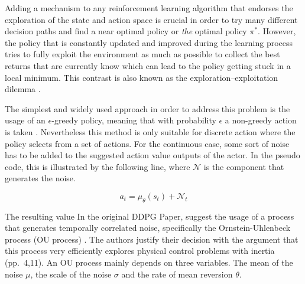 Adding a mechanism to any reinforcement learning algorithm that endorses the exploration of the state and action space is crucial in order to try many different decision paths and find a near optimal policy or \textit{the} optimal policy $\pi^*$. However, the policy that is constantly updated and improved during the learning process tries to fully exploit the environment as much as possible to collect the best returns that are currently know which can lead to the policy getting stuck in a local minimum. This contrast is also known as the exploration–exploitation dilemma \cite[p.~3]{Sutton1998}.
\par
The simplest and widely used approach in order to address this problem is the usage of an $\epsilon$-greedy policy, meaning that with probability $\epsilon$ a non-greedy action is taken \cite[p.~100]{Sutton1998}. Nevertheless this method is only suitable for discrete action where the policy selects from a set of actions. For the continuous case, some sort of noise has to be added to the suggested action value outputs of the actor. In the pseudo code, this is illustrated by the following line, where $\mathcal{N}$ is the component that generates the noise.
\par
\begin{equation*}
    a_t = \mu_\theta(s_t) + \mathcal{N}_t
\end{equation*}
\par 
The resulting value 
In the original DDPG Paper, \cite{lillicrap2019continuous} suggest the usage of a process that generates temporally correlated noise, specifically the Ornstein-Uhlenbeck process (OU process) \cite[]{uhlenbeck1930theory}. The authors justify their decision with the argument that this process very efficiently explores physical control problems with inertia (pp.~4,11). An OU process mainly depends on three variables. The mean of the noise $\mu$, the scale of the noise $\sigma$ and the rate of mean reversion $\theta$.
\par



